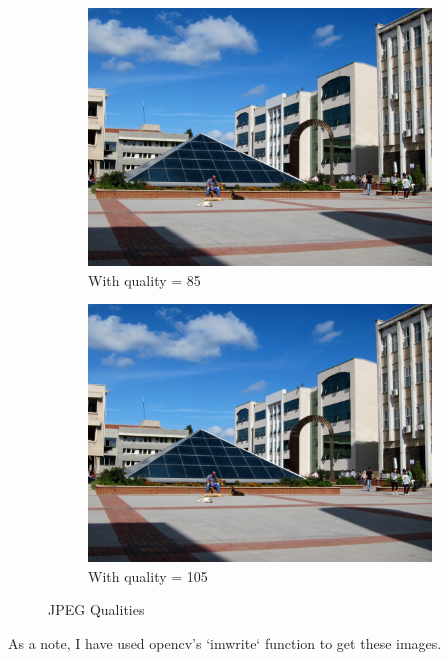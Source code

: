 \documentclass[12pt]{article}
\begin{document}
\begin{figure}[H]
\begin{subfigure}{0.45\textwidth}
        \includegraphics[height=0.75\textwidth]{images/kuzey-85.jpg}
        \caption{With quality = 85}
        \label{jpeg-85}
    \end{subfigure}
    \begin{subfigure}{0.45\textwidth}
        \centering
        \includegraphics[height=0.75\textwidth]{images/kuzey-105.jpg}
        \caption{With quality = 105}
        \label{jpeg-105}
    \end{subfigure}
    \caption{JPEG Qualities}
    \label{fig:jpeg-quality}
\end{figure}

As a note, I have used opencv's `imwrite` function to get these images.
\end{document}
